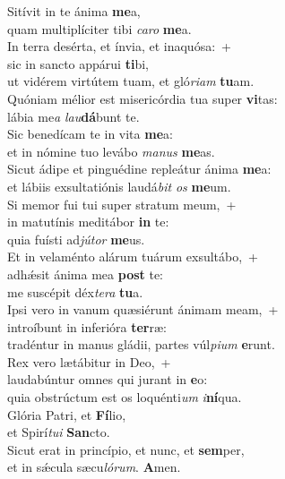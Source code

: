 \evenverse Sitívit in te ánima \textbf{me}a,~\*\\
\evenverse quam multiplíciter tibi \textit{ca}\textit{ro} \textbf{me}a.\\
\oddverse In terra desérta, et ínvia, et inaquósa:~+\\
\oddverse  sic in sancto appárui \textbf{ti}bi,~\*\\
\oddverse ut vidérem virtútem tuam, et gló\textit{ri}\textit{am} \textbf{tu}am.\\
\evenverse Quóniam mélior est misericórdia tua super \textbf{vi}tas:~\*\\
\evenverse lábia me\textit{a} \textit{lau}\textbf{dá}bunt te.\\
\oddverse Sic benedícam te in vita \textbf{me}a:~\*\\
\oddverse et in nómine tuo levábo \textit{ma}\textit{nus} \textbf{me}as.\\
\evenverse Sicut ádipe et pinguédine repleátur ánima \textbf{me}a:~\*\\
\evenverse et lábiis exsultatiónis laudá\textit{bit} \textit{os} \textbf{me}um.\\
\oddverse Si memor fui tui super stratum meum,~+\\
\oddverse  in matutínis meditábor \textbf{in} te:~\*\\
\oddverse quia fuísti ad\textit{jú}\textit{tor} \textbf{me}us.\\
\evenverse Et in velaménto alárum tuárum exsultábo,~+\\
\evenverse  adhǽsit ánima mea \textbf{post} te:~\*\\
\evenverse me suscépit déx\textit{te}\textit{ra} \textbf{tu}a.\\
\oddverse Ipsi vero in vanum quæsiérunt ánimam meam,~+\\
\oddverse  introíbunt in inferióra \textbf{ter}ræ:~\*\\
\oddverse tradéntur in manus gládii, partes vúl\textit{pi}\textit{um} \textbf{e}runt.\\
\evenverse Rex vero lætábitur in Deo,~+\\
\evenverse  laudabúntur omnes qui jurant in \textbf{e}o:~\*\\
\evenverse quia obstrúctum est os loquénti\textit{um} \textit{i}\textbf{ní}qua.\\
\oddverse Glória Patri, et \textbf{Fí}lio,~\*\\
\oddverse et Spirí\textit{tu}\textit{i} \textbf{San}cto.\\
\evenverse Sicut erat in princípio, et nunc, et \textbf{sem}per,~\*\\
\evenverse et in sǽcula sæcu\textit{ló}\textit{rum}. \textbf{A}men.\\
